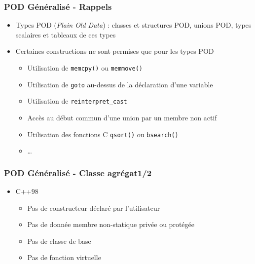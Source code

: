 \documentclass[C++.tex]{subfiles}
\begin{document}
\begin{frame}[fragile]
	\frametitle{POD Généralisé - Rappels}
	\begin{itemize}
		\item Types POD (\textit{Plain Old Data}) : classes et structures POD, unions POD, types scalaires et tableaux de ces types
		\item Certaines constructions ne sont permises que pour les types POD


		\begin{itemize}
			\item Utilisation de \lstinline|memcpy()| ou \lstinline|memmove()|
			\item Utilisation de \lstinline|goto| \og au-dessus\fg{} de la déclaration d'une variable


			\item Utilisation de \lstinline|reinterpret_cast|
			\item Accès au début commun d'une union par un membre non actif
			\item Utilisation des fonctions C \lstinline|qsort()| ou \lstinline|bsearch()|
			\item \ldots
		\end{itemize}
	\end{itemize}
\end{frame}

\begin{frame}[fragile]
	\frametitle{POD Généralisé - Classe agrégat\titlehfill{}1/2}
	\begin{itemize}
		\item C++98
		\begin{itemize}
			\item Pas de constructeur déclaré par l'utilisateur
			\item Pas de donnée membre non-statique privée ou protégée
			\item Pas de classe de base
			\item Pas de fonction virtuelle
		\end{itemize}
	\end{itemize}
\end{frame}
\end{document}

